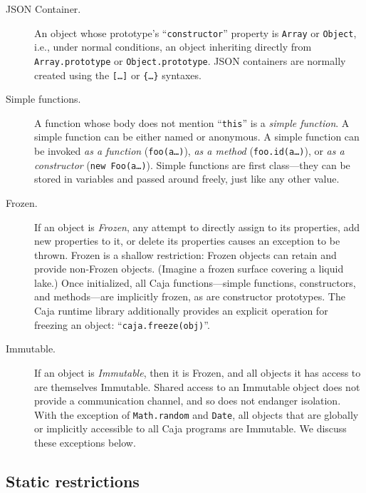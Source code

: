 \documentclass[letterpaper,twocolumn,10pt]{article}
\newcommand{\code}[1]{{\tt {#1}}}              %
\begin{document}
\begin{description}

  \item[JSON Container.] An object whose prototype's ``\code{constructor}'' 
  property is \code{Array} or \code{Object}, i.e., under normal conditions, 
  an object inheriting directly from \code{Array.prototype} or 
  \code{Object.prototype}. JSON containers are normally created using the
  \code{[\ldots]} or \code{\{\ldots\}} syntaxes.

  \item[Simple functions.] A function whose body does not mention 
  ``\code{this}'' is a \emph{simple function}. A simple function can be 
  either named or anonymous. A simple function can be invoked \emph{as a 
  function} (\code{foo(a\ldots)}), \emph{as a method} 
  (\code{foo.id(a\ldots)}), or \emph{as a constructor} (\code{new 
  Foo(a\ldots)}). Simple functions are first class---they can be stored in
  variables and passed around freely, just like any other value.
  
  \item[Frozen.] If an object is \emph{Frozen}, any attempt to directly 
  assign to its properties, add new properties to it, or delete its 
  properties causes an exception to be thrown. Frozen is a shallow 
  restriction: Frozen objects can retain and provide non-Frozen objects. 
  (Imagine a frozen surface covering a liquid lake.) Once initialized, all 
  Caja functions---simple functions, constructors, and methods---are 
  implicitly frozen, as are constructor prototypes. The Caja runtime library 
  additionally provides an explicit operation for freezing an object: 
  ``\code{caja.freeze(obj)}''.
  
  \item[Immutable.] If an object is \emph{Immutable}, then it is Frozen, and 
  all objects it has access to are themselves Immutable. Shared access to an 
  Immutable object does not provide a communication channel, and so does not 
  endanger isolation. With the exception of \code{Math.random} and 
  \code{Date}, all objects that are globally or implicitly accessible to all 
  Caja programs are Immutable. We discuss these exceptions below.  

\end{description}

\subsection{Static restrictions}
\end{document}
